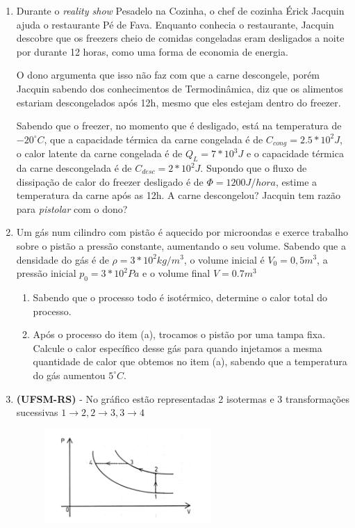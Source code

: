 \documentclass[12pt,letterpaper,fleqn]{article}
\begin{document}
\begin{enumerate}
    \item Durante o \textit{reality show} Pesadelo na Cozinha, o chef de cozinha Érick Jacquin ajuda o restaurante Pé de Fava. Enquanto conhecia o restaurante, Jacquin descobre que os freezers cheio de comidas congeladas eram desligados a noite por durante 12 horas, como uma forma de economia de energia.
    
    O dono argumenta que isso não faz com que a carne descongele, porém Jacquin sabendo dos conhecimentos de Termodinâmica, diz que os alimentos estariam descongelados após 12h, mesmo que eles estejam dentro do freezer.
    
    Sabendo que o freezer, no momento que é desligado, está na temperatura de $-20^{\circ}C$, que a capacidade térmica da carne congelada é de $C_{cong}=2.5*10^2 J$, o calor latente da carne congelada é de $Q_L = 7*10^3 J$ e o capacidade térmica da carne descongelada é de $C_{desc}=2*10^2 J$. Supondo que o fluxo de dissipação de calor do freezer desligado é de $\Phi=1200 J/hora$, estime a temperatura da carne após as 12h. A carne descongelou? Jacquin tem razão para \textit{pistolar} com o dono?
    
    \item Um gás num cilindro com pistão é aquecido por microondas e exerce trabalho sobre o pistão a pressão constante, aumentando o seu volume. Sabendo que a densidade do gás é de $\rho = 3*10^{2}kg/m^3$, o volume inicial é $V_0 = 0,5 m^3$, a pressão inicial $p_0 = 3*10^2 Pa$ e o volume final $V=0.7 m^3$
    
    \begin{enumerate}
        \item Sabendo que o processo todo é isotérmico, determine o calor total do processo.
        \item Após o processo do item (a), trocamos o pistão por uma tampa fixa. Calcule o calor específico desse gás para quando injetamos a mesma quantidade de calor que obtemos no item (a), sabendo que a temperatura do gás aumentou $5^\circ C$.
    \end{enumerate}
    
    \item \textbf{(UFSM-RS)} - No gráfico estão representadas 2 isotermas e 3 transformações sucessivas $1\rightarrow 2, 2\rightarrow 3, 3\rightarrow 4$
    
    \begin{figure}[h]
        \centering
        \includegraphics[width=0.6\textwidth]{ciclo.png}
    \end{figure}
    

\end{enumerate}
\end{document}
